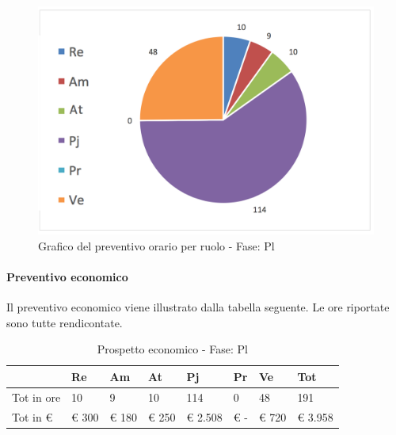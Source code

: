 			\begin{figure}[H]
			\centering
			\includegraphics[scale=0.35]{img/h_r_Pl}
			\caption{Grafico del preventivo orario per ruolo - Fase: Pl}
			\label{fig:h_r_Pl"}
			\end{figure}

			\newpage
			\paragraph{Preventivo economico}
			Il preventivo economico viene illustrato dalla tabella seguente. Le ore riportate sono tutte rendicontate.\\


							\begin{table}[H] \begin{center} \begin{tabular}{llllllll}
							\toprule
								&	\textbf{Re}	&	\textbf{Am}	&	\textbf{At}	&	\textbf{Pj}	&	\textbf{Pr}	&	\textbf{Ve}	&	\textbf{Tot}\\

							\midrule
							Tot in ore	&	10	&	9	&	10	&	114	&	0	&	48	&	191	 \\


							Tot in €	&	 €     300 	 & 	 €      180 	 & 	 €     250 	 & 	 €  2.508 	 & 	 €        -   	 & 	 €     720 	 & 	 €     3.958 	 \\
							\bottomrule
							\end{tabular} \end{center} \caption{Prospetto economico - Fase:
							Pl
							}\label{tab:s_Pl} \end{table}


